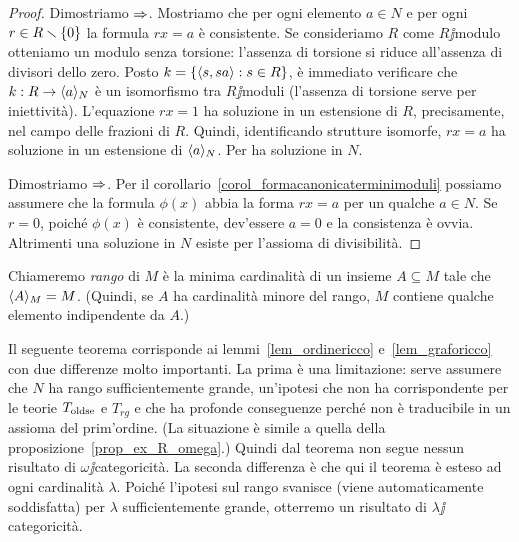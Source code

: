 \begin{proof}
Dimostriamo $\Rightarrow$. Mostriamo che per ogni elemento $a\in N$ e per ogni $r\in R\smallsetminus \{0\}$ la formula $rx=a$ \`e consistente. Se consideriamo $R$ come $R\jj$modulo otteniamo un modulo senza torsione: l'assenza di torsione si riduce all'assenza di divisori dello zero.  Posto $k=\{\langle s,sa\rangle : s\in R\}$, \`e immediato verificare che $k:R\rightarrow\langle a\rangle_N$ \`e un isomorfismo tra $R\jj$moduli (l'assenza di torsione serve per iniettivit\`a). L'equazione $rx=1$ ha soluzione in un estensione di $R$, precisamente, nel campo delle frazioni di $R$. Quindi, identificando strutture isomorfe, $rx=a$ ha soluzione in un estensione di $\langle a\rangle_N$. Per  ha soluzione in $N$.

Dimostriamo $\Rightarrow$. Per il corollario~\ref{corol_formacanonicaterminimoduli} possiamo assumere che la formula $\phi(x)$ abbia la forma $r x= a$ per un qualche $a\in N$. Se $r=0$, poich\'e $\phi(x)$ \`e consistente, dev'essere $a=0$ e la consistenza \`e ovvia. Altrimenti una soluzione in $N$ esiste per l'assioma di divisibilit\`a.
\end{proof}

Chiameremo \emph{rango\/} di $M$ \`e la minima cardinalit\`a di un insieme $A\subseteq M$ tale che $\langle A\rangle_M=M$. (Quindi, se $A$ ha cardinalit\`a minore del rango, $M$ contiene qualche elemento indipendente da $A$.)

Il seguente teorema corrisponde ai lemmi~\ref{lem_ordinericco} e~\ref{lem_graforicco} con due differenze molto importanti. La prima \`e una limitazione: serve assumere che $N$ ha rango sufficientemente grande, un'ipotesi che non ha corrispondente per le teorie $T_{\rm oldse}$ e $T_{rg}$ e che ha profonde conseguenze perch\'e non \`e traducibile in un assioma del prim'ordine. (La situazione \`e simile a quella della proposizione~\ref{prop_ex_R_omega}.) Quindi dal teorema non segue nessun risultato di $\omega\jj$categoricit\`a. La seconda differenza \`e che qui il teorema \`e esteso ad ogni cardinalit\`a $\lambda$. Poich\'e l'ipotesi sul rango svanisce (viene automaticamente soddisfatta) per $\lambda$ sufficientemente grande, otterremo un risultato di $\lambda\jj$categoricit\`a.


